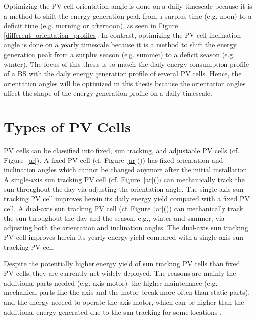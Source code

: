 Optimizing the PV cell orientation angle is done on a daily timescale because it is a method to shift the energy generation peak from a surplus time (e.g. noon) to a deficit time (e.g. morning or afternoon), as seen in Figure \ref{different_orientation_profiles}. In contrast, optimizing the PV cell inclination angle is done on a yearly timescale because it is a method to shift the energy generation peak from a surplus season (e.g. summer) to a deficit season (e.g. winter). The focus of this thesis is to match the daily energy consumption profile of a BS with the daily energy generation profile of several PV cells. Hence, the orientation angles will be optimized in this thesis because the orientation angles affect the shape of the energy generation profile on a daily timescale. 




\section{Types of PV Cells\label{type_pv}}
PV cells can be classified into fixed, sun tracking, and adjustable PV cells (cf. \mbox{Figure \ref{ar}}). A fixed PV cell (cf. \mbox{Figure \ref{ar}()}) has fixed orientation and inclination angles which cannot be changed anymore after the initial installation. A single-axis sun tracking PV cell (cf. \mbox{Figure \ref{ar}()}) can mechanically track the sun throughout the day via adjusting the orientation angle. The single-axis sun tracking PV cell improves herein its daily energy yield compared with a fixed PV cell. A dual-axis sun tracking PV cell (cf. \mbox{Figure \ref{ar}()}) can mechanically track the sun throughout the day and the season, e.g., winter and summer, via adjusting both the orientation and inclination angles. The dual-axis sun tracking PV cell improves herein its yearly energy yield compared with a single-axis sun tracking PV cell. 


Despite the potentially higher energy yield of sun tracking PV cells than fixed PV cells, they are currently not widely deployed. The reasons are mainly the additional parts needed (e.g. axis motor), the higher maintenance (e.g. mechanical parts like the axis and the motor break more often than static parts), and the energy needed to operate the axis motor, which can be higher than the additional energy generated due to the sun tracking for some locations \cite{EKE20122665}. 



